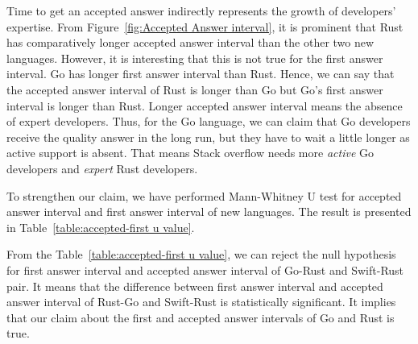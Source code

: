 Time to get an accepted answer indirectly represents the growth of developers' expertise. From Figure~\ref{fig:Accepted Answer interval}, it is prominent that Rust has comparatively longer accepted answer interval than the other two new languages. However, it is interesting that this is not true for the first answer interval. Go has longer first answer interval than Rust. Hence, we can say that the accepted answer interval of Rust is longer than Go but Go's first answer interval is longer than Rust. Longer accepted answer interval means the absence of expert developers. Thus, for the Go language, we can claim that Go developers receive the quality answer in the long run, but they have to wait a little longer as active support is absent. That means Stack overflow needs more \emph{active} Go developers and \emph{expert} Rust developers.


To strengthen our claim, we have performed Mann-Whitney U test for accepted answer interval and first answer interval of new languages. The result is presented in Table~\ref{table:accepted-first u value}.

From the Table~\ref{table:accepted-first u value}, we can reject the null hypothesis for first answer interval and accepted answer interval of Go-Rust and Swift-Rust pair. It means that the difference between first answer interval and accepted answer interval of Rust-Go and Swift-Rust is statistically significant. It implies that our claim about the first and accepted answer intervals of Go and Rust is true.


